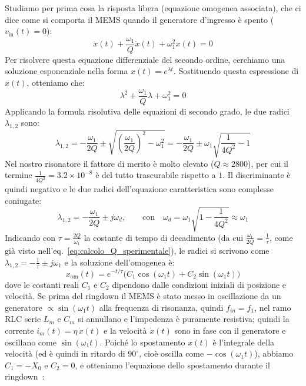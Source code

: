\documentclass[11pt,a4paper]{article}
\begin{document}
\vspace{0.3cm}
\noindent Studiamo per prima cosa la risposta libera (equazione omogenea associata), che ci dice come si comporta il MEMS quando il generatore d'ingresso è spento ($v_{\text{in}}(t) = 0$):
\begin{equation}
    \label{eq:ode_omogenea_decay}
    \ddot{x}(t) + \frac{\omega_1}{Q} \dot{x}(t) + \omega_1^2 x(t) = 0
\end{equation}
Per risolvere questa equazione differenziale del secondo ordine, cerchiamo una soluzione esponenziale nella forma $x(t) = e^{\lambda t}$. Sostituendo questa espressione di $x(t)$, otteniamo che:
\begin{equation}
    \lambda^2 + \frac{\omega_1}{Q} \lambda + \omega_1^2 = 0
\end{equation}
Applicando la formula risolutiva delle equazioni di secondo grado, le due radici $\lambda_{1,2}$ sono:
\begin{equation}
    \lambda_{1,2} = -\frac{\omega_1}{2Q} \pm \sqrt{\left(\frac{\omega_1}{2Q}\right)^2 - \omega_1^2} = -\frac{\omega_1}{2Q} \pm \omega_1 \sqrt{\frac{1}{4Q^2} - 1}
\end{equation}
Nel nostro risonatore il fattore di merito è molto elevato ($Q \approx 2800$), per cui il termine $\frac{1}{4Q^2} = 3.2 \times 10^{-8}$ è del tutto trascurabile rispetto a $1$. Il discriminante è quindi negativo e le due radici dell'equazione caratteristica sono complesse coniugate:
\begin{equation}
    \lambda_{1,2} = -\frac{\omega_1}{2Q} \pm j\omega_d, \qquad \text{con} \quad \omega_d = \omega_1 \sqrt{1 - \frac{1}{4Q^2}} \approx \omega_1
\end{equation}
Indicando con $\tau = \frac{2Q}{\omega_1}$ la costante di tempo di decadimento (da cui $\frac{\omega_1}{2Q} = \frac{1}{\tau}$, come già visto nell'eq.~\eqref{eq:calcolo_Q_sperimentale}), le radici si scrivono come $\lambda_{1,2} = -\frac{1}{\tau} \pm j\omega_1$ e la soluzione dell'omogenea è:
\begin{equation}
    \label{eq:sol_omogenea_generale}
    x_{\text{om}}(t) = e^{-t/\tau} \Big( C_1 \cos(\omega_1 t) + C_2 \sin(\omega_1 t) \Big)
\end{equation}
dove le costanti reali $C_1$ e $C_2$ dipendono dalle condizioni iniziali di posizione e velocità. Se prima del ringdown il MEMS è stato messo in oscillazione da un generatore $\propto \sin(\omega_1 t)$ alla frequenza di risonanza, quindi $f_{in}=f_1$, nel ramo RLC serie $L_m$ e $C_m$ si annullano e l'impedenza è puramente resistiva; quindi la corrente $i_m(t) = \eta \, \dot{x}(t)$ e la velocità $\dot{x}(t)$ sono in fase con il generatore e oscillano come $\sin(\omega_1 t)$. Poiché lo spostamento $x(t)$ è l'integrale della velocità (ed è quindi in ritardo di $90^\circ$, cioè oscilla come $-\cos(\omega_1 t)$), abbiamo $C_1 = -X_0$ e $C_2 = 0$, e otteniamo l'equazione dello spostamento durante il ringdown~\cite{wu2021}:
\end{document}
